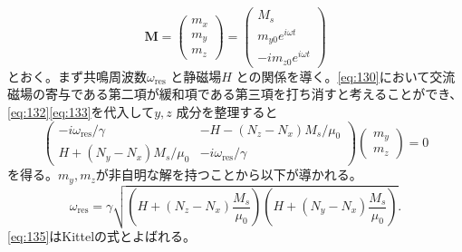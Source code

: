 \documentclass[dvipdfmx]{jsreport}
\numberwithin{equation}{chapter}
\numberwithin{table}{chapter}
\begin{document}
\begin{equation}
\label{eq:133}
	\bm{M} =\begin{pmatrix} m_x\\m_y\\m_z \end{pmatrix} = \begin{pmatrix} M_s\\m_{y0}e^{i\omega t}\\-im_{z 0}e^{i\omega t} \end{pmatrix} 
\end{equation}
とおく。まず共鳴周波数$\omega_\text{res} $ と静磁場$H$ との関係を導く。\eqref{eq:130}において交流磁場の寄与である第二項が緩和項である第三項を打ち消すと考えることができ、\eqref{eq:132}\eqref{eq:133}を代入して$y,z$ 成分を整理すると
\begin{equation}
\label{eq:134}
\begin{pmatrix} -i \omega_\text{res}  /\gamma&-H-(N_z-N_x) M_s /\mu_0 \\ H+(N_y-N_x) M_s /\mu_0 & -i \omega_\text{res} /\gamma\end{pmatrix} \begin{pmatrix} m_y \\ m_z \end{pmatrix} =0
\end{equation}
を得る。$m_y,m_z$が非自明な解を持つことから以下が導かれる。
\begin{equation}
\label{eq:135}
	\omega_\text{res} =\gamma \sqrt{\left( H+(N_z-N_x) \frac{M_s}{\mu_0} \right)\left( H+(N_y-N_x) \frac{M_s}{\mu_0} \right)  } 
.\end{equation}
\eqref{eq:135}はKittelの式とよばれる。
\end{document}
